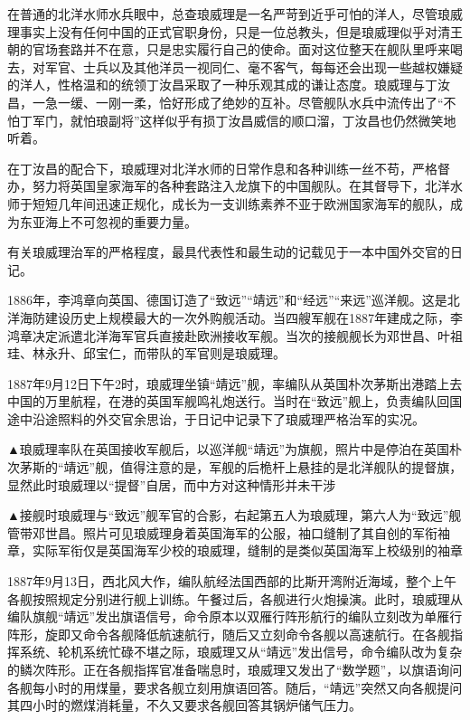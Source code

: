\documentclass[12pt,UTF8]{ctexbook}
\begin{document}
在普通的北洋水师水兵眼中，总查琅威理是一名严苛到近乎可怕的洋人，尽管琅威理事实上没有任何中国的正式官职身份，只是一位总教头，但是琅威理似乎对清王朝的官场套路并不在意，只是忠实履行自己的使命。面对这位整天在舰队里呼来喝去，对军官、士兵以及其他洋员一视同仁、毫不客气，每每还会出现一些越权嫌疑的洋人，性格温和的统领丁汝昌采取了一种乐观其成的谦让态度。琅威理与丁汝昌，一急一缓、一刚一柔，恰好形成了绝妙的互补。尽管舰队水兵中流传出了“不怕丁军门，就怕琅副将”这样似乎有损丁汝昌威信的顺口溜，丁汝昌也仍然微笑地听着。

在丁汝昌的配合下，琅威理对北洋水师的日常作息和各种训练一丝不苟，严格督办，努力将英国皇家海军的各种套路注入龙旗下的中国舰队。在其督导下，北洋水师于短短几年间迅速正规化，成长为一支训练素养不亚于欧洲国家海军的舰队，成为东亚海上不可忽视的重要力量。

有关琅威理治军的严格程度，最具代表性和最生动的记载见于一本中国外交官的日记。

1886年，李鸿章向英国、德国订造了“致远”“靖远”和“经远”“来远”巡洋舰。这是北洋海防建设历史上规模最大的一次外购舰活动。当四艘军舰在1887年建成之际，李鸿章决定派遣北洋海军官兵直接赴欧洲接收军舰。当次的接舰舰长为邓世昌、叶祖珪、林永升、邱宝仁，而带队的军官则是琅威理。

1887年9月12日下午2时，琅威理坐镇“靖远”舰，率编队从英国朴次茅斯出港踏上去中国的万里航程，在港的英国军舰鸣礼炮送行。当时在“致远”舰上，负责编队回国途中沿途照料的外交官余思诒，于日记中记录下了琅威理严格治军的实况。


▲琅威理率队在英国接收军舰后，以巡洋舰“靖远”为旗舰，照片中是停泊在英国朴次茅斯的“靖远”舰，值得注意的是，军舰的后桅杆上悬挂的是北洋舰队的提督旗，显然此时琅威理以“提督”自居，而中方对这种情形并未干涉


▲接舰时琅威理与“致远”舰军官的合影，右起第五人为琅威理，第六人为“致远”舰管带邓世昌。照片可见琅威理身着英国海军的公服，袖口缝制了其自创的军衔袖章，实际军衔仅是英国海军少校的琅威理，缝制的是类似英国海军上校级别的袖章

1887年9月13日，西北风大作，编队航经法国西部的比斯开湾附近海域，整个上午各舰按照规定分别进行舰上训练。午餐过后，各舰进行火炮操演。此时，琅威理从编队旗舰“靖远”发出旗语信号，命令原本以双雁行阵形航行的编队立刻改为单雁行阵形，旋即又命令各舰降低航速航行，随后又立刻命令各舰以高速航行。在各舰指挥系统、轮机系统忙碌不堪之际，琅威理又从“靖远”发出信号，命令编队改为复杂的鳞次阵形。正在各舰指挥官准备喘息时，琅威理又发出了“数学题”，以旗语询问各舰每小时的用煤量，要求各舰立刻用旗语回答。随后，“靖远”突然又向各舰提问其四小时的燃煤消耗量，不久又要求各舰回答其锅炉储气压力。
\end{document}
